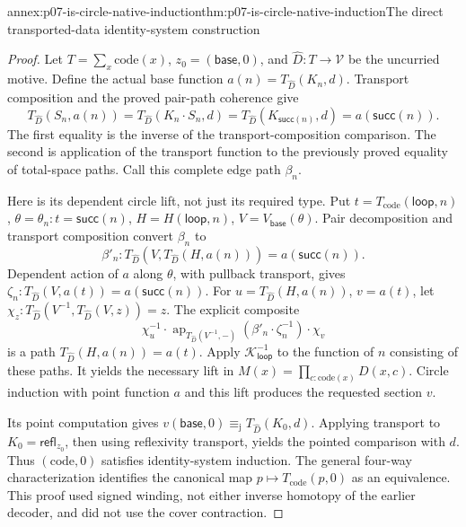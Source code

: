 \begin{annexitem}{annex:p07-is-circle-native-induction}{thm:p07-is-circle-native-induction}{The direct transported-data identity-system construction}
\begin{proof}
Let \(T=\sum_x\mathrm{code}(x)\), \(z_0=(\mathsf{base},0)\),
and \(\widehat D:T\to\mathcal V\) be the uncurried motive.
Define the actual base function
\(a(n)=T_{\widehat D}(K_n,d)\).
Transport composition and the proved pair-path coherence give
\[
T_{\widehat D}(S_n,a(n))
 =T_{\widehat D}(K_n\cdot S_n,d)
 =T_{\widehat D}(K_{\mathsf{succ}(n)},d)
 =a(\mathsf{succ}(n)).
\]
The first equality is the inverse of the transport-composition
comparison. The second is application of the transport function
to the previously proved equality of total-space paths.
Call this complete edge path \(\beta_n\).

Here is its dependent circle lift, not just its required type.
Put \(t=T_{\mathrm{code}}(\mathsf{loop},n)\),
\(\theta=\theta_n:t=\mathsf{succ}(n)\),
\(H=H(\mathsf{loop},n)\), \(V=V_{\mathsf{base}}(\theta)\).
Pair decomposition and transport composition convert \(\beta_n\)
to
\[
\beta'_n:
T_{\widehat D}(V,T_{\widehat D}(H,a(n)))
                                  =a(\mathsf{succ}(n)).
\]
Dependent action of \(a\) along \(\theta\), with pullback transport,
gives
\(\zeta_n:T_{\widehat D}(V,a(t))=a(\mathsf{succ}(n))\).
For \(u=T_{\widehat D}(H,a(n))\), \(v=a(t)\), let
\(\chi_z:T_{\widehat D}(V^{-1},T_{\widehat D}(V,z))=z\).
The explicit composite
\[
\chi_u^{-1}\cdot
\operatorname{ap}_{T_{\widehat D}(V^{-1},-)}
      (\beta'_n\cdot\zeta_n^{-1})
\cdot\chi_v
\]
is a path \(T_{\widehat D}(H,a(n))=a(t)\).
Apply \(\mathcal K_{\mathsf{loop}}^{-1}\) to the function
of \(n\) consisting of these paths. It yields the necessary lift
in \(M(x)=\prod_{c:\mathrm{code}(x)}D(x,c)\).
Circle induction with point function \(a\) and this lift produces
the requested section \(v\).

Its point computation gives \(v(\mathsf{base},0)
\equiv_{\mathrm j}T_{\widehat D}(K_0,d)\).
Applying transport to \(K_0=\mathsf{refl}_{z_0}\), then using
reflexivity transport, yields the pointed comparison with \(d\).
Thus \((\mathrm{code},0)\) satisfies identity-system induction.
The general four-way characterization identifies the canonical
map \(p\mapsto T_{\mathrm{code}}(p,0)\) as an equivalence.
This proof used signed winding, not either inverse homotopy of
the earlier decoder, and did not use the cover contraction.
\end{proof}
\end{annexitem}
